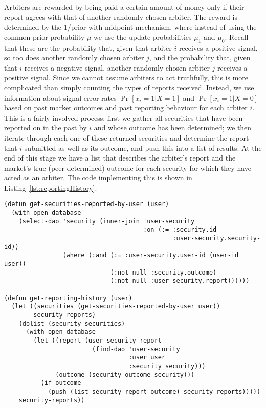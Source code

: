 
Arbiters are rewarded by being paid a certain amount of money only if their
report agrees with that of another randomly chosen arbiter. The reward is
determined by the 1/prior-with-midpoint mechanism, where instead of using the
common prior probability $\mu$ we use the update probabilities $\mu_1$ and
$\mu_0$. Recall that these are the probability that, given that arbiter $i$
receives a positive signal, so too does another randomly chosen arbiter $j$,
and the probability that, given that $i$ receives a negative signal, another
randomly chosen arbiter $j$ receives a positive signal. Since we cannot assume
arbiters to act truthfully, this is more complicated than simply counting the
types of reports received. Instead, we use information about signal error rates
$\Pr[x_i=1|X=1]$ and $\Pr[x_i=1|X=0]$ based on past market outcomes and past
reporting behaviour for each arbiter $i$. This is a fairly involved process:
first we gather all securities that have been reported on in the past by $i$
and whose outcome has been determined; we then iterate through each one of
these returned securities and determine the report that $i$ submitted as well
as its outcome, and push this into a list of results. At the end of this stage
we have a list  that describes the
arbiter's report and the market's true (peer-determined) outcome for each
security for which they have acted as an arbiter. The code implementing this is
shown in Listing~\ref{lst:reportingHistory}.

\begin{lstlisting}[float,
	label={lst:reportingHistory},
	caption={Gathering a user's reporting history}]
(defun get-securities-reported-by-user (user)
  (with-open-database
    (select-dao 'security (inner-join 'user-security
                                      :on (:= :security.id
                                              :user-security.security-id))
                (where (:and (:= :user-security.user-id (user-id user))
                             (:not-null :security.outcome)
                             (:not-null :user-security.report))))))

(defun get-reporting-history (user)
  (let ((securities (get-securities-reported-by-user user))
        security-reports)
	(dolist (security securities)
	  (with-open-database
	    (let ((report (user-security-report
	                    (find-dao 'user-security
	                              :user user
	                              :security security)))
              (outcome (security-outcome security)))
	      (if outcome
            (push (list security report outcome) security-reports)))))
	security-reports))
\end{lstlisting}

